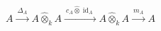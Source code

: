 \(
A\xrightarrow{\ \Delta_A\ }A\widehat\otimes_k A
\xrightarrow{\ c_A\widehat\otimes\operatorname{id}_A\ }
A\widehat\otimes_k A
\xrightarrow{\ m_A\ }A
\)
